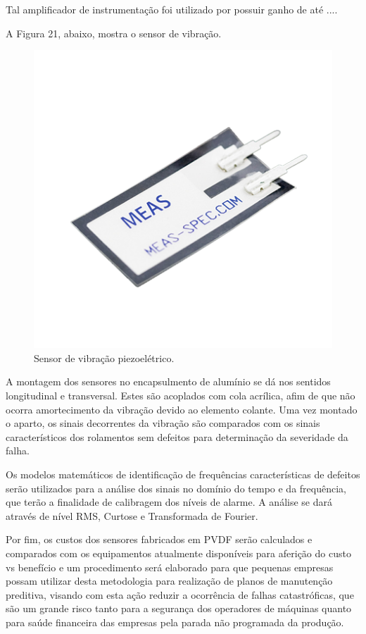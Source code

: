 \documentclass[
	12pt,				
	oneside,			
	a4paper,			
	english,			
	brazil				
	]{abntex2ppgsi}
\begin{document}
Tal amplificador de instrumentação foi utilizado por possuir ganho de até .... 

A Figura 21, abaixo, mostra o sensor de vibração. 

\begin{figure}[!htb]
\centering
\includegraphics{Figura21}
\caption {Sensor de vibração piezoelétrico.}
\label{Figura21}
\end{figure} 

A montagem dos sensores no encapsulmento de alumínio se dá nos sentidos longitudinal e transversal. Estes são acoplados com cola acrílica, afim de que não ocorra amortecimento da vibração devido ao elemento colante. Uma vez montado o aparto, os sinais decorrentes da vibração são comparados com os sinais característicos dos rolamentos sem defeitos para determinação da severidade da falha.

Os modelos matemáticos de identificação de frequências características de defeitos serão utilizados para a análise dos sinais no domínio do tempo e da frequência, que terão a finalidade de calibragem dos níveis de alarme. A análise se dará através de nível RMS, Curtose e Transformada de Fourier.  

Por fim, os custos dos sensores fabricados em PVDF serão calculados e comparados com os equipamentos atualmente disponíveis para aferição do custo vs benefício e um procedimento será elaborado para que pequenas empresas possam utilizar desta metodologia para realização de planos de manutenção preditiva, visando com esta ação reduzir a ocorrência de falhas catastróficas, que são um grande risco tanto para a segurança dos operadores de máquinas quanto para saúde financeira das empresas pela parada não programada da produção.
\end{document}
